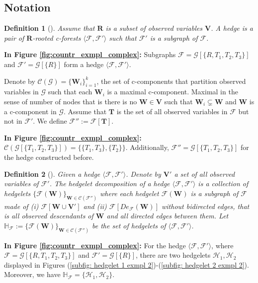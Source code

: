 \documentclass[accepted]{uai2022}
\newtheorem{definition}{Definition}
\newcommand{\V}[0]{\mathbf{V}}
\newcommand{\W}[0]{\mathbf{W}}
\newcommand{\T}[0]{\mathbf{T}}
\newcommand{\G}[0]{\mathcal{G}}
\newcommand{\F}[0]{\mathcal{F}}
\begin{document}
    \subsection{Notation} \label{apn: A notation}
        \begin{definition}[\citep{lee2019general}]
            Assume that $\mathbf{R}$ is a subset of observed variables $\V$. A hedge is a pair of $\mathbf{R}$-rooted c-forests $\langle \F, \F' \rangle$ such that $\F'$ is a subgraph of $\F$.
        \end{definition}
        \textbf{In Figure \ref{fig:countr_exmpl_complex}:} Subgraphs $\F = \G[\{R, T_1, T_2, T_3\}]$ and $\F' = \G[\{R\}]$ form a hedge $\langle \F, \F' \rangle$.
        
        Denote by $\mathcal{C}(\G)=\{\textbf{W}_i\}_{i=1}^{k}$, the set of c-components that partition observed variables in $\G$ such that each $\W_i$ is a maximal c-component. Maximal in the sense of number of nodes that is there is no $\W \in \V$ such that $\W_i \subsetneq \W$ and $\W$ is a c-component in $\G$. 
        Assume that $\T$ is the set of all observed variables in $\F$ but not in $\F'$. 
        We define $\F'':=\F[\textbf{T}]$. 
        
        \textbf{In Figure \ref{fig:countr_exmpl_complex}:} $\mathcal{C}(\G[\{T_1, T_2, T_3\}]) = \{ \{T_1, T_3\}, \{T_2\}\}$. Additionally, $\F'' = \G[\{T_1, T_2, T_3\}]$ for the hedge constructed before.

        \begin{definition}[\cite{lee2019general}]
            Given a hedge $\langle \F, \F' \rangle$. Denote by $\V'$ a set of all observed variables of $\F'$. The hedgelet decomposition of a hedge $\langle \F, \F' \rangle$ is a collection of hedgelets $\{\F(\W)\}_{\W \in \mathcal{C}(\F'')}$ where each hedgelet $\F(\W)$ is a subgraph of $\F$ made of (i) $\F[\W\cup \V']$ and (ii) $\F[De_\mathcal{F}(\W)]$ without bidirected edges, that is all observed descendants of $\W$ and all directed edges between them. 
            Let $\mathbb{H}_{\F} := \{\F(\W)\}_{\W \in \mathcal{C}(\F'')}$ be the set of hedgelets of $\langle \F, \F' \rangle$.
        \end{definition}

        \textbf{In Figure \ref{fig:countr_exmpl_complex}:} For the hedge $\langle \F, \F' \rangle$, where $\F = \G[\{R, T_1, T_2, T_3\}]$ and $\F' = \G[\{R\}]$, there are two hedgelets $\mathcal{H}_1, \mathcal{H}_2$ displayed in Figures (\ref{subfig: hedgelet 1 exmpl 2})-(\ref{subfig: hedgelet 2 exmpl 2}). Moreover, we have $\mathbb{H}_{\F} = \{\mathcal{H}_1, \mathcal{H}_2\}$.
        
\end{document}
